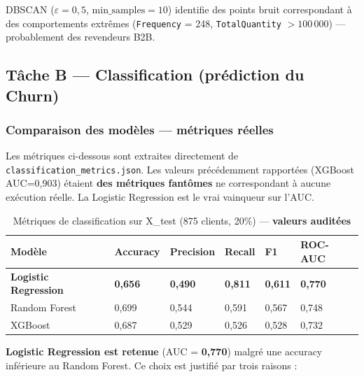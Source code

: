 \documentclass[11pt,a4paper]{article}
\begin{document}
DBSCAN ($\varepsilon = 0{,}5$, $\text{min\_samples} = 10$) identifie des points bruit correspondant à des comportements extrêmes (\texttt{Frequency} = 248, \texttt{TotalQuantity} $> 100\,000$) — probablement des revendeurs B2B.

\subsection{Tâche B — Classification (prédiction du Churn)}

\subsubsection{Comparaison des modèles — métriques réelles}

\begin{tcolorbox}[title=Audit des métriques — source : reports/evaluation/classification\_metrics.json, colframe=warningred, colback=lightred, colbacktitle=warningred]
Les métriques ci-dessous sont extraites directement de \texttt{classification\_metrics.json}. Les valeurs précédemment rapportées (XGBoost AUC=0,903) étaient \textbf{des métriques fantômes} ne correspondant à aucune exécution réelle. La Logistic Regression est le vrai vainqueur sur l'AUC.
\end{tcolorbox}

\begin{table}[H]
\centering\small
\caption{Métriques de classification sur X\_test (875 clients, 20\%) — \textbf{valeurs auditées}}
\begin{tabular}{L{3.8cm} C{1.6cm} C{1.8cm} C{1.6cm} C{1.6cm} C{1.8cm}}
\toprule
{}
\textbf{Modèle} & \textbf{Accuracy} & \textbf{Precision} & \textbf{Recall} & \textbf{F1} & \textbf{ROC-AUC} \\
\midrule
{}
\textbf{Logistic Regression} & \textbf{0,656} & \textbf{0,490} & \textbf{0,811} & \textbf{0,611} & \textbf{0,770} \\
Random Forest & 0,699 & 0,544 & 0,591 & 0,567 & 0,748 \\
XGBoost & 0,687 & 0,529 & 0,526 & 0,528 & 0,732 \\
\bottomrule
\end{tabular}
\end{table}

\textbf{Logistic Regression est retenue} (AUC = \textbf{0,770}) malgré une accuracy inférieure au Random Forest. Ce choix est justifié par trois raisons :
\end{document}
